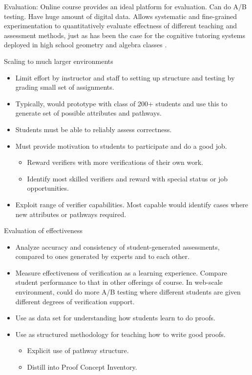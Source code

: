 \documentclass[12pt]{article}
\begin{document}
Evaluation: Online course provides an ideal platform for evaluation.
Can do A/B testing.  Have huge amount of digital data.  Allows
systematic and fine-grained experimentation to quantitatively evaluate
effectness of different teaching and assessment methods, just as has
been the case for the cognitive tutoring systems deployed in high
school geometry and algebra classes \cite{anderson-jls09}.

Scaling to much larger environments

\begin{itemize}
\item Limit effort by instructor and staff to setting up structure and
  testing by grading small set of assignments.
\item Typically, would prototype with class of 200+ students and
  use this to generate set of possible attributes and pathways.
\item Students must be able to reliably assess correctness.
\item Must provide motivation to students to participate and do a good job.
\begin{itemize}
\item Reward verifiers with more verifications of their own work.
\item Identify most skilled verifiers and reward with special status
  or job opportunities.
\end{itemize}
\item Exploit range of verifier capabilities.  Most capable would
  identify cases where new attributes or pathways required.
\end{itemize}

Evaluation of effectiveness

\begin{itemize}
\item Analyze accuracy and consistency of student-generated
  assessments, compared to ones generated by experts and to each other.
\item Measure effectiveness of verification as a learning experience.
  Compare student performance to that in other offerings of course.
  In web-scale environment, could do more A/B testing where different
  students are given different degrees of verification support.
\item Use as data set for understanding how students learn to do proofs.
\item Use as structured methodology for teaching how to write good proofs.
\begin{itemize}
\item Explicit use of pathway structure.
\item Distill into Proof Concept Inventory.
\end{itemize}

\end{itemize}
\end{document}
